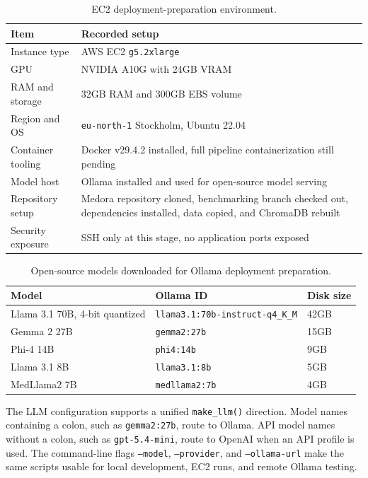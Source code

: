 \begin{table}[htbp]
\centering
\caption{EC2 deployment-preparation environment.}
\label{tab:deployment_environment}
\begin{tabular}{p{} p{}}
\toprule
\textbf{Item} & \textbf{Recorded setup}\\
\midrule
Instance type & AWS EC2 \texttt{g5.2xlarge}\\
GPU & NVIDIA A10G with 24GB VRAM\\
RAM and storage & 32GB RAM and 300GB EBS volume\\
Region and OS & \texttt{eu-north-1} Stockholm, Ubuntu 22.04\\
Container tooling & Docker v29.4.2 installed, full pipeline containerization still pending\\
Model host & Ollama installed and used for open-source model serving\\
Repository setup & Medora repository cloned, benchmarking branch checked out, dependencies installed, data copied, and ChromaDB rebuilt\\
Security exposure & SSH only at this stage, no application ports exposed\\
\bottomrule
\end{tabular}
\end{table}

\begin{table}[htbp]
\centering
\caption{Open-source models downloaded for Ollama deployment preparation.}
\label{tab:ollama_models}
\begin{tabular}{p{} p{} p{}}
\toprule
\textbf{Model} & \textbf{Ollama ID} & \textbf{Disk size}\\
\midrule
Llama 3.1 70B, 4-bit quantized & \texttt{llama3.1:70b-instruct-q4\_K\_M} & 42GB\\
Gemma 2 27B & \texttt{gemma2:27b} & 15GB\\
Phi-4 14B & \texttt{phi4:14b} & 9GB\\
Llama 3.1 8B & \texttt{llama3.1:8b} & 5GB\\
MedLlama2 7B & \texttt{medllama2:7b} & 4GB\\
\bottomrule
\end{tabular}
\end{table}

The LLM configuration supports a unified \texttt{make\_llm()} direction. Model names containing a colon, such as \texttt{gemma2:27b}, route to Ollama. API model names without a colon, such as \texttt{gpt-5.4-mini}, route to OpenAI when an API profile is used. The command-line flags \texttt{--model}, \texttt{--provider}, and \texttt{--ollama-url} make the same scripts usable for local development, EC2 runs, and remote Ollama testing.

